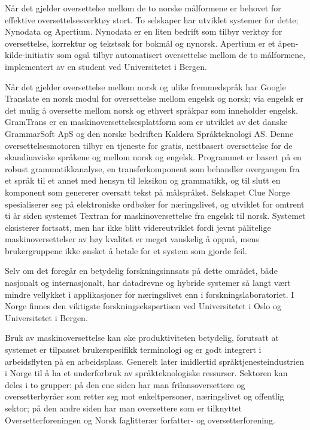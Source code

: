 \begin{multicols}{2}

Når det gjelder oversettelse mellom de to norske målformene er behovet for effektive oversettelsesverktøy stort. To selskaper har utviklet systemer for dette; Nynodata og Apertium. Nynodata er en liten bedrift som tilbyr verktøy for oversettelse, korrektur og tekstsøk for bokmål og nynorsk. Apertium er et åpen-kilde-initiativ som også tilbyr automatisert oversettelse mellom de to målformene, implementert av en student ved Universitetet i Bergen.

Når det gjelder oversettelse mellom norsk og ulike fremmedspråk har Google Translate en norsk modul for oversettelse mellom engelsk og norsk; via engelsk er det mulig å oversette mellom norsk og ethvert språkpar som inneholder engelsk. GramTrans er en maskinoversettelsesplattform som er utviklet av det danske GrammarSoft ApS og den norske bedriften Kaldera Språkteknologi AS. Denne oversettelsesmotoren tilbyr en tjeneste for gratis, nettbasert oversettelse for de skandinaviske språkene og mellom norsk og engelsk. Programmet er basert på en robust grammatikkanalyse, en transferkomponent som behandler overgangen fra et språk til et annet med hensyn til leksikon og grammatikk, og til slutt en komponent som genererer oversatt tekst på målspråket. Selskapet Clue Norge spesialiserer seg på elektroniske ordbøker for næringslivet, og utviklet for omtrent ti år siden systemet Textran for maskinoversettelse fra engelsk til norsk. Systemet eksisterer fortsatt, men har ikke blitt videreutviklet fordi jevnt pålitelige maskinoversettelser av høy kvalitet er meget vanskelig å oppnå, mens brukergruppene ikke ønsket å betale for et system som gjorde feil.

Selv om det foregår en betydelig forskningsinnsats på dette området, både nasjonalt og internasjonalt, har datadrevne og hybride systemer så langt vært mindre vellykket i applikasjoner for næringslivet enn i forskningslaboratoriet. I Norge finnes den viktigste forskningsekspertisen ved Universitetet i Oslo og Universitetet i Bergen.

Bruk av maskinoversettelse kan øke produktiviteten betydelig, forutsatt at systemet er tilpasset brukerspesifikk terminologi og er godt integrert i arbeidsflyten på en arbeidsplass. Generelt later imidlertid språktjenesteindustrien i Norge til å ha et underforbruk av språkteknologiske ressurser. 
Sektoren kan deles i to grupper: på den ene siden har man frilansoversettere og oversetterbyråer som retter seg mot enkeltpersoner, næringslivet og offentlig sektor; på den andre siden har man oversettere som er tilknyttet Oversetterforeningen og Norsk faglitterær forfatter- og oversetterforening.


\end{multicols}
